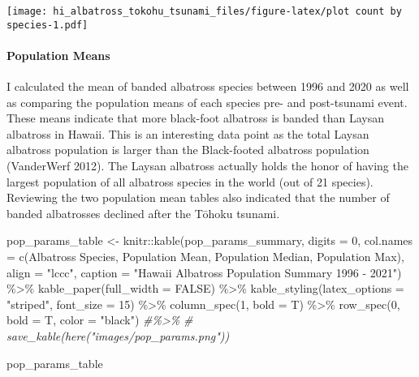 \documentclass[
]{article}
\newenvironment{Shaded}{\begin{snugshade}}{\end{snugshade}}
\newcommand{\AttributeTok}[1]{\textcolor[rgb]{0.77,0.63,0.00}{#1}}
\newcommand{\CommentTok}[1]{\textcolor[rgb]{0.56,0.35,0.01}{\textit{#1}}}
\newcommand{\ConstantTok}[1]{\textcolor[rgb]{0.00,0.00,0.00}{#1}}
\newcommand{\DecValTok}[1]{\textcolor[rgb]{0.00,0.00,0.81}{#1}}
\newcommand{\FunctionTok}[1]{\textcolor[rgb]{0.00,0.00,0.00}{#1}}
\newcommand{\NormalTok}[1]{#1}
\newcommand{\OtherTok}[1]{\textcolor[rgb]{0.56,0.35,0.01}{#1}}
\newcommand{\SpecialCharTok}[1]{\textcolor[rgb]{0.00,0.00,0.00}{#1}}
\newcommand{\StringTok}[1]{\textcolor[rgb]{0.31,0.60,0.02}{#1}}
\begin{document}
\texttt{[image: hi\_albatross\_tokohu\_tsunami\_files/figure-latex/plot count by species-1.pdf]}

\hypertarget{population-means}{%
\paragraph{Population Means}\label{population-means}}

I calculated the mean of banded albatross species between 1996 and 2020
as well as comparing the population means of each species pre- and
post-tsunami event. These means indicate that more black-foot albatross
is banded than Laysan albatross in Hawaii. This is an interesting data
point as the total Laysan albatross population is larger than the
Black-footed albatross population (VanderWerf 2012). The Laysan
albatross actually holds the honor of having the largest population of
all albatross species in the world (out of 21 species). Reviewing the
two population mean tables also indicated that the number of banded
albatrosses declined after the Tōhoku tsunami.

\begin{Shaded}
\begin{Highlighting}[]
\NormalTok{pop\_params\_table }\OtherTok{\textless{}{-}}\NormalTok{ knitr}\SpecialCharTok{::}\FunctionTok{kable}\NormalTok{(pop\_params\_summary,}
                                 \AttributeTok{digits =} \DecValTok{0}\NormalTok{,}
                                 \AttributeTok{col.names =} \FunctionTok{c}\NormalTok{(}\StringTok{\textquotesingle{}Albatross Species\textquotesingle{}}\NormalTok{, }\StringTok{\textquotesingle{}Population Mean\textquotesingle{}}\NormalTok{, }\StringTok{\textquotesingle{}Population Median\textquotesingle{}}\NormalTok{, }\StringTok{\textquotesingle{}Population Max\textquotesingle{}}\NormalTok{),}
                                 \AttributeTok{align =} \StringTok{"lccc"}\NormalTok{,}
                                 \AttributeTok{caption =} \StringTok{"Hawaii Albatross Population Summary 1996 {-} 2021"}\NormalTok{) }\SpecialCharTok{\%\textgreater{}\%}
  \FunctionTok{kable\_paper}\NormalTok{(}\AttributeTok{full\_width =} \ConstantTok{FALSE}\NormalTok{) }\SpecialCharTok{\%\textgreater{}\%}
  \FunctionTok{kable\_styling}\NormalTok{(}\AttributeTok{latex\_options =} \StringTok{"striped"}\NormalTok{,}
                \AttributeTok{font\_size =} \DecValTok{15}\NormalTok{) }\SpecialCharTok{\%\textgreater{}\%} 
  \FunctionTok{column\_spec}\NormalTok{(}\DecValTok{1}\NormalTok{, }\AttributeTok{bold =}\NormalTok{ T) }\SpecialCharTok{\%\textgreater{}\%}
  \FunctionTok{row\_spec}\NormalTok{(}\DecValTok{0}\NormalTok{, }\AttributeTok{bold =}\NormalTok{ T, }\AttributeTok{color =} \StringTok{"black"}\NormalTok{) }\CommentTok{\#\%\textgreater{}\% }
  \CommentTok{\# save\_kable(here("images/pop\_params.png"))}

\NormalTok{pop\_params\_table }
\end{Highlighting}
\end{Shaded}
\end{document}
